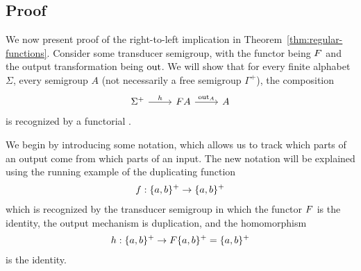 



\subsection{Proof}

We now present proof of the right-to-left implication in Theorem~\ref{thm:regular-functions}. Consider some transducer semigroup, with the functor being $\functor$ and the output transformation being $\mathrm{out}$. We will show that for every finite alphabet $\Sigma$, every semigroup $A$ (not necessarily a free semigroup $\Gamma^+$), the composition 
\[
    \begin{tikzcd}
    \Sigma^+ 
    \ar[r,"h"]
    &
    \functor A
    \ar[r,"\outfun_A"]
    &
    A
    \end{tikzcd}
    \]
is recognized by a functorial \sst.


We begin by introducing some notation, which allows us to track which parts of an output come from which parts of an input. The new notation will be explained using the running example of the duplicating function 
\begin{align*}
f : \{a,b\}^+ \to \{a,b\}^+
\end{align*}
which is recognized by the 
transducer semigroup 
in which the functor $\functor$ is the identity, the output mechanism is duplication, and the homomorphism 
\begin{align*}
h : \set{a,b}^+ \to \functor \set{a,b}^+ = \set{a,b}^+
\end{align*}
is the identity.

